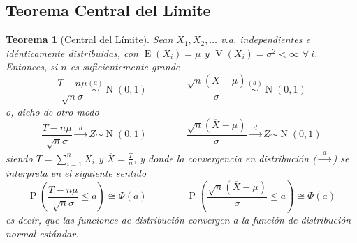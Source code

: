 \documentclass[11pt]{article}
\theoremstyle{plain}
\newtheorem*{teo}{Teorema}
\theoremstyle{definition}
\theoremstyle{remark}
\newcommand{\proba}{\ensuremath{\operatorname{P}}}  %
\newcommand{\esp}[0]{\ensuremath{\operatorname{E}}}  %
\newcommand{\var}[0]{\ensuremath{\operatorname{V}}}  %
\newcommand{\foralle}{\ensuremath{\forall \ }}  %
\newcommand{\dist}[1]{\ensuremath{\sim \operatorname{#1}}}  %
\newcommand{\distt}[2]{\ensuremath{\overset{#1}{\sim} \operatorname{#2}}}  %
\newcommand{\tiende}[1]{\ensuremath{\xrightarrow{\;\; #1 \;\;}}}  %
\begin{document}
  \subsection{Teorema Central del Límite}

    \begin{teo}[Central del Límite]
      Sean $X_1,X_2,\dots$ v.a. independientes e idénticamente distribuidas, con $\esp(X_i) = \mu$ y $\var(X_i) = \sigma^2 < \infty$ $\foralle i$. Entonces, si $n$ es suficientemente grande
      \[ \frac{T - n\mu}{\sqrt{n} \sigma} \distt{(a)}{N}(0,1) \qquad \qquad \frac{\sqrt{n} (\overline{X} - \mu)}{\sigma} \distt{(a)}{N}(0,1) \]
      o, dicho de otro modo
      \[ \frac{T - n\mu}{\sqrt{n} \sigma} \tiende{d} Z\dist{N}(0,1) \qquad \qquad \frac{\sqrt{n} (\overline{X} - \mu)}{\sigma} \tiende{d} Z\dist{N}(0,1) \]
      siendo $T = \sum_{i=1}^n X_i$ y $\overline{X} = \frac{T}{n}$, y
      donde la convergencia en distribución ($\tiende{d}$) se interpreta en el siguiente sentido
      \[ \proba\left( \frac{T - n\mu}{\sqrt{n} \sigma} \leq a \right) \cong \Phi(a) \qquad \qquad \proba\left( \frac{\sqrt{n} (\overline{X} - \mu)}{\sigma} \leq a \right) \cong \Phi(a) \]
      es decir, que las funciones de distribución convergen a la función de distribución normal estándar.
    \end{teo}
\end{document}
